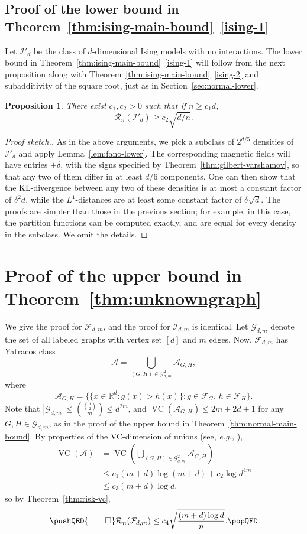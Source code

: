 \documentclass[letterpaper]{amsart}
\makeatletter
\newcommand{\sG}{\mathcal{G}}
\newcommand{\sI}{\mathcal{I}}
\newcommand{\sF}{\mathcal{F}}
\newcommand{\sR}{\mathcal{R}}
\newcommand{\sA}{\mathcal{A}}
\newcommand{\R}{\mathbb{R}}
\DeclareMathOperator{\VC}{VC}
\let\originalleft\left
\let\originalright\right
\def\left#1{\mathopen{}\originalleft#1}
\def\right#1{\originalright#1\mathclose{}}
\newcommand*{\eg}{\emph{e.g.,}\@\xspace}
\newcommand{\secref}[1]{\mbox{Section~\ref{sec:#1}}}
\newcommand{\thmref}[1]{Theorem~\ref{thm:#1}}
\numberwithin{thm}{section}
\newcommand{\lemref}[1]{Lemma~\ref{lem:#1}}
\newtheorem{prop}[thm]{Proposition}{\bfseries}{\itshape}
\newcommand{\proplabel}[1]{\label{prop:#1}}
\theoremstyle{definition}
\theoremstyle{plain}
\makeatother
\begin{document}
\subsection{Proof of the lower bound in \thmref{ising-main-bound}~\ref{ising-1}}
Let $\sI'_d$ be the class of $d$-dimensional Ising models with no
interactions. The lower bound in
\thmref{ising-main-bound}~\ref{ising-1} will follow from the next
proposition along with \thmref{ising-main-bound}~\ref{ising-2} and
subadditivity of the square root, just as in \secref{normal-lower}.
\begin{prop}\proplabel{no-external}
  There exist $c_1, c_2 > 0$ such that if $n \ge c_1 d$, 
  \[
    \sR_n(\sI'_d) \ge c_2 \sqrt{d/n} .
  \]
\end{prop}
\begin{proof}[Proof sketch.]
  As in the above arguments, we pick a subclass of $2^{d/5}$ densities
  of $\sI'_d$ and apply \lemref{fano-lower}.  The corresponding
  magnetic fields will have entries $\pm \delta$, with the signs
  specified by \thmref{gilbert-varshamov}, so that any two of them
  differ in at least $d/6$ components.  One can then show that the
  KL-divergence between any two of these densities is at most a
  constant factor of $\delta^2 d$, while the $L^1$-distances are at
  least some constant factor of $\delta \sqrt{d}$.  The proofs are
  simpler than those in the previous section; for example, in this
  case, the partition functions can be computed exactly, and are equal
  for every density in the subclass. We omit the details.
\end{proof}

\section{Proof of the upper bound in \thmref{unknowngraph}}
\label{sec:unknowngraph}
We give the proof for $\sF_{d,m}$, and the proof for $\sI_{d,m}$ is
identical.  Let $\sG_{d, m}$ denote the set of all labeled graphs with
vertex set $[d]$ and $m$ edges.  Now, $\sF_{d,m}$ has Yatracos class
\[
  \sA = \bigcup_{(G, H) \in \sG_{d, m}^2} \sA_{G, H} ,
\]
where
\[
  \sA_{G, H} = \Big\{ \{ x \in \R^d \colon g(x) > h(x)\} \colon g \in \sF_G, \, h \in \sF_H \Big\} .
\]	
Note that $|\sG_{d, m}| \le \binom{\binom{d}{2}}{m} \leq d^{2m}$, and
$\VC(\sA_{G, H}) \le 2m + 2d+1$ for any $G, H \in \sG_{d, m}$, as in
the proof of the upper bound in \thmref{normal-main-bound}. By
properties of the VC-dimension of unions (see, \eg
\cite[Exercise~6.11]{understanding}),
\begin{align*}
  \VC(\sA) &= \VC\left( \bigcup_{(G, H) \in \sG_{d, m}^2} \sA_{G, H} \right) \\
           &\le c_1 (m+d) \log (m+d) + c_2 \log d^{4m} \\
           &\le c_3 (m + d) \log d ,
\end{align*}
so by \thmref{risk-vc},
\[ \pushQED{\qed}
	\sR_n(\sF_{d, m}) \le c_4 \sqrt{\frac{(m + d) \log d}{n}} . \qedhere
   \popQED
\]
\end{document}
